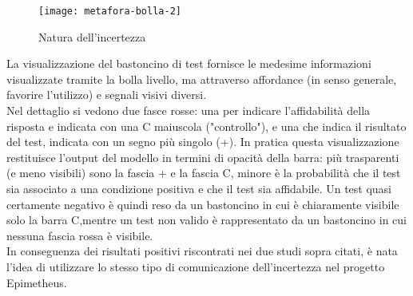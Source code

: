 \begin{figure}[!ht] 
    \centering 
    \texttt{[image: metafora-bolla-2]} 
    \caption{Natura dell'incertezza}
\end{figure}

La visualizzazione del bastoncino di test fornisce le medesime informazioni visualizzate tramite la bolla livello, ma attraverso affordance (in senso generale, favorire l'utilizzo) e segnali visivi diversi.\\
Nel dettaglio si vedono due fasce rosse: una per indicare l'affidabilità della risposta e indicata con una C maiuscola ("controllo"), e una che indica il risultato del test, indicata con un segno più singolo (+). In pratica questa visualizzazione restituisce l'output del modello in termini di opacità della barra: più trasparenti (e meno visibili) sono la fascia + e la fascia C, minore è la probabilità che il test sia associato a una condizione positiva e che il test sia affidabile. Un test quasi certamente negativo è quindi reso da un bastoncino in cui è chiaramente visibile solo la barra C,mentre un test non valido è rappresentato da un bastoncino in cui nessuna fascia rossa è  visibile.\\

In conseguenza dei risultati positivi riscontrati nei due studi sopra citati, è nata l'idea di utilizzare lo stesso tipo di comunicazione dell'incertezza nel progetto Epimetheus.

